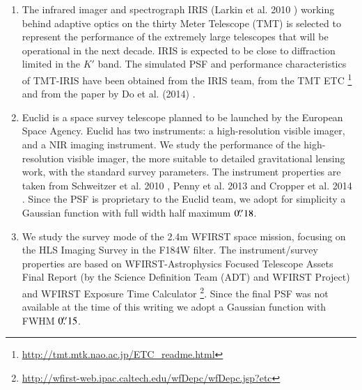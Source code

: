 \documentclass[a4paper,11pt]{article}
\begin{document}
\begin{enumerate}
\item The infrared imager and spectrograph IRIS (Larkin et al. 2010 \citep{2010SPIE.7735E..29L}) working behind adaptive optics on the thirty Meter Telescope (TMT) is selected to represent the performance of the extremely large telescopes that will be operational in the next decade. IRIS is expected to be close to diffraction limited in the $K'$ band. The simulated PSF and performance characteristics of TMT-IRIS have been obtained from the IRIS team, from the TMT ETC \footnote{\url{http://tmt.mtk.nao.ac.jp/ETC_readme.html}} and from the paper by Do et al. (2014) \citep{2014AJ....147...93D}.
    
\item Euclid is a space survey telescope planned to be launched by the European Space Agency. Euclid has two instruments: a high-resolution visible imager, and a NIR imaging instrument.
We study the performance of the high-resolution visible imager, the
more suitable to detailed gravitational lensing work, with the
standard survey parameters.  The instrument properties are taken from
Schweitzer et al. 2010
\cite{2010SPIE.7731E..1KS}, Penny et al. 2013
\cite{2013MNRAS.434....2P} and Cropper et al. 2014
\cite{2014SPIE.9143E..0JC}.
Since the PSF is proprietary to the Euclid team, we adopt for simplicity a Gaussian function with full width half maximum $0\hbox{$.\!\!^{\prime\prime}$}18$.
  
\item We study the survey mode of the 2.4m WFIRST space mission, focusing on the HLS Imaging Survey in the F184W filter.
The instrument/survey properties are based on WFIRST-Astrophysics Focused Telescope Assets Final Report (by the Science Definition Team (ADT) and WFIRST Project) and WFIRST Exposure Time Calculator \footnote{\url{http://wfirst-web.ipac.caltech.edu/wfDepc/wfDepc.jsp?etc}}. Since the final PSF was not available at the time of this writing we adopt a Gaussian function with FWHM $0\hbox{$.\!\!^{\prime\prime}$}15$.
     

\end{enumerate}
\end{document}
